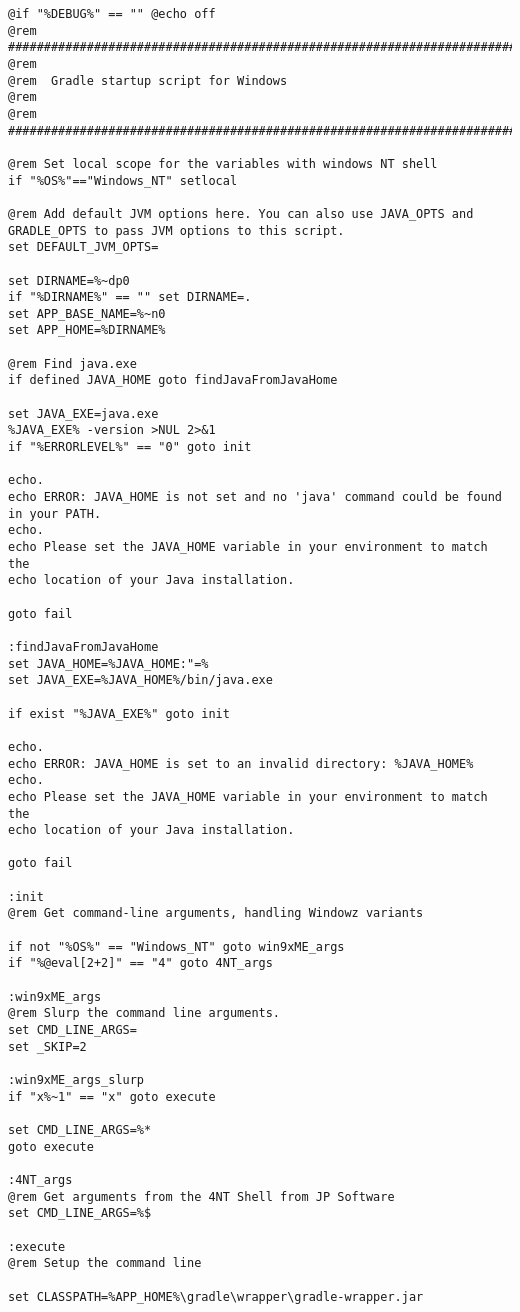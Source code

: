 \documentclass[12pt,a4paper]{article}
\begin{document}
\begin{lstlisting}[caption=./gradlew.bat]
@if "%DEBUG%" == "" @echo off
@rem ##########################################################################
@rem
@rem  Gradle startup script for Windows
@rem
@rem ##########################################################################

@rem Set local scope for the variables with windows NT shell
if "%OS%"=="Windows_NT" setlocal

@rem Add default JVM options here. You can also use JAVA_OPTS and GRADLE_OPTS to pass JVM options to this script.
set DEFAULT_JVM_OPTS=

set DIRNAME=%~dp0
if "%DIRNAME%" == "" set DIRNAME=.
set APP_BASE_NAME=%~n0
set APP_HOME=%DIRNAME%

@rem Find java.exe
if defined JAVA_HOME goto findJavaFromJavaHome

set JAVA_EXE=java.exe
%JAVA_EXE% -version >NUL 2>&1
if "%ERRORLEVEL%" == "0" goto init

echo.
echo ERROR: JAVA_HOME is not set and no 'java' command could be found in your PATH.
echo.
echo Please set the JAVA_HOME variable in your environment to match the
echo location of your Java installation.

goto fail

:findJavaFromJavaHome
set JAVA_HOME=%JAVA_HOME:"=%
set JAVA_EXE=%JAVA_HOME%/bin/java.exe

if exist "%JAVA_EXE%" goto init

echo.
echo ERROR: JAVA_HOME is set to an invalid directory: %JAVA_HOME%
echo.
echo Please set the JAVA_HOME variable in your environment to match the
echo location of your Java installation.

goto fail

:init
@rem Get command-line arguments, handling Windowz variants

if not "%OS%" == "Windows_NT" goto win9xME_args
if "%@eval[2+2]" == "4" goto 4NT_args

:win9xME_args
@rem Slurp the command line arguments.
set CMD_LINE_ARGS=
set _SKIP=2

:win9xME_args_slurp
if "x%~1" == "x" goto execute

set CMD_LINE_ARGS=%*
goto execute

:4NT_args
@rem Get arguments from the 4NT Shell from JP Software
set CMD_LINE_ARGS=%$

:execute
@rem Setup the command line

set CLASSPATH=%APP_HOME%\gradle\wrapper\gradle-wrapper.jar


\end{lstlisting}
\end{document}
